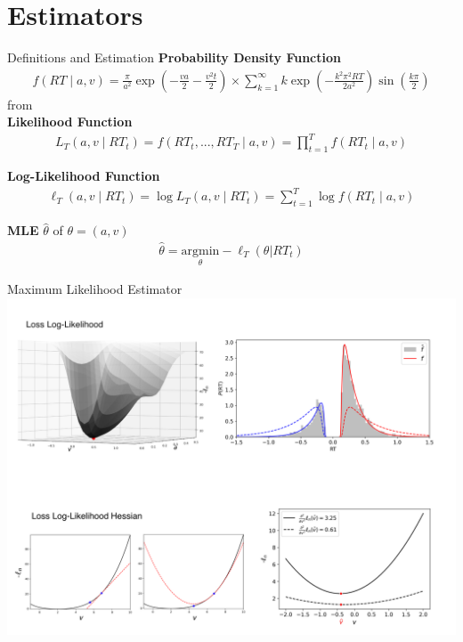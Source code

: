 \documentclass[8pt]{beamer}
\begin{document}
\section{Estimators}

\begin{frame}{Definitions and Estimation}
\textbf{Probability Density Function}
\begin{align}
    f(RT \mid a, v) = \frac{\pi}{a^2}\exp\left(-\frac{va}{2}-\frac{v^2t}{2}\right) \times\sum_{k=1}^\infty k\exp\left(-\frac{k^2\pi^2 RT}{2a^2}\right)\sin(\frac{k\pi}{2})
\end{align}
from \citet{feller_introduction_1968, navarro_fast_2009}\\

\vspace{.25cm}
\textbf{Likelihood Function}
\begin{align}
    L_T(a, v \mid RT_t) = f(RT_t, ..., RT_T \mid a, v) = \prod_{t=1}^T f(RT_t \mid a, v)
\end{align}

\vspace{.25cm}
\textbf{Log-Likelihood Function}
\begin{align}
    \ell_T (a, v \mid RT_t) = \log L_T(a, v \mid RT_t) = \sum_{t=1}^T \log f(RT_t \mid a, v)
\end{align}

\vspace{.25cm}
\textbf{MLE} $\hat\theta$ of $\theta = (a, v)$ 
\begin{align}
    \hat\theta = \underset{\theta}{\text{argmin}} -\ell_T (\theta | RT_t)
\end{align}

\end{frame}


\begin{frame}{Maximum Likelihood Estimator}
    \includegraphics[width=1\textwidth]{docs/slides/figures/mle.png}
\end{frame}
\end{document}
